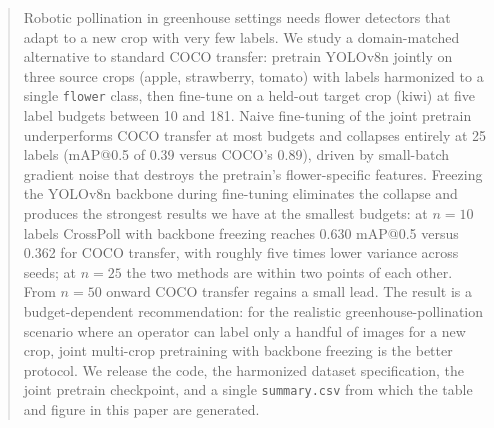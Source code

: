 \begin{abstract}
Robotic pollination in greenhouse settings needs flower detectors that adapt to a new crop with very few labels. We study a domain-matched alternative to standard COCO transfer: pretrain YOLOv8n jointly on three source crops (apple, strawberry, tomato) with labels harmonized to a single \texttt{flower} class, then fine-tune on a held-out target crop (kiwi) at five label budgets between 10 and 181. Naive fine-tuning of the joint pretrain underperforms COCO transfer at most budgets and collapses entirely at 25 labels (mAP@0.5 of 0.39 versus COCO's 0.89), driven by small-batch gradient noise that destroys the pretrain's flower-specific features. Freezing the YOLOv8n backbone during fine-tuning eliminates the collapse and produces the strongest results we have at the smallest budgets: at $n{=}10$ labels CrossPoll with backbone freezing reaches 0.630 mAP@0.5 versus 0.362 for COCO transfer, with roughly five times lower variance across seeds; at $n{=}25$ the two methods are within two points of each other. From $n{=}50$ onward COCO transfer regains a small lead. The result is a budget-dependent recommendation: for the realistic greenhouse-pollination scenario where an operator can label only a handful of images for a new crop, joint multi-crop pretraining with backbone freezing is the better protocol. We release the code, the harmonized dataset specification, the joint pretrain checkpoint, and a single \texttt{summary.csv} from which the table and figure in this paper are generated.
\end{abstract}

